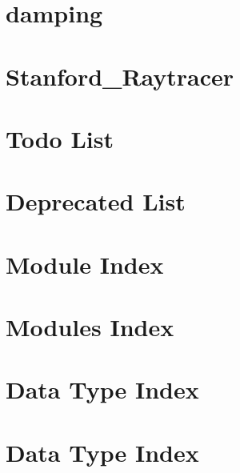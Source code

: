 \let\mypdfximage\pdfximage\def\pdfximage{\immediate\mypdfximage}\documentclass[twoside]{book}
\newcommand{\+}{\discretionary{\mbox{\scriptsize$\hookleftarrow$}}{}{}}
\begin{document}
\chapter{damping}
\label{md___users_rileyannereid__pycharm_projects__stanford__raytracer_damping__r_e_a_d_m_e}

\chapter{Stanford\+\_\+\+Raytracer}
\label{md___users_rileyannereid__pycharm_projects__stanford__raytracer__r_e_a_d_m_e}

\chapter{Todo List}
\label{todo}

\chapter{Deprecated List}
\label{deprecated}

\chapter{Module Index}

\chapter{Modules Index}

\chapter{Data Type Index}

\chapter{Data Type Index}

\end{document}
